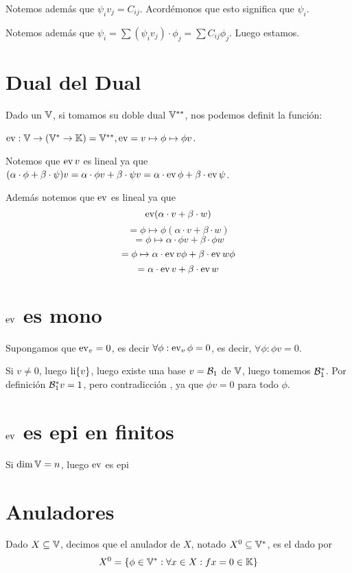 \documentclass{article}
\begin{document}
	Notemos además que $\psi_iv_j = C_{ij}$. Acordémonos que esto significa que
	$\psi_i$.

	Notemos además que $\psi_i = \sum (\psi_i v_j) \cdot \phi_j = \sum C_{ij}
	\phi_j$. Luego estamos.

	\section*{Dual del Dual}
	Dado un $\mathbb{V}$, si tomamos su doble dual $\mathbb{V}^{**}$, nos podemos definit la
	función:

	$\operatorname{ev} : \mathbb{V} \to (\mathbb{V}^* \to \mathbb{K}) = \mathbb{V}^{**}, \operatorname{ev} = v \mapsto \phi \mapsto
	\phi v$.

	Notemos que $\operatorname{ev} v$ es lineal ya que $(\alpha \cdot \phi + \beta \cdot \psi)v = 
	\alpha \cdot \phi v + \beta \cdot \psi v = \alpha \cdot \operatorname{ev} \phi + \beta
	\cdot \operatorname{ev} \psi
	$.

	Además notemos que $\operatorname{ev}$ es lineal ya que \[
		\operatorname{ev} (\alpha \cdot v + \beta \cdot w)
	\]\[
		= \phi \mapsto \phi (\alpha \cdot v + \beta \cdot w)
	\]\[
		= \phi \mapsto \alpha \cdot \phi v + \beta \cdot \phi w
	\]\[
		= \phi \mapsto \alpha \cdot \operatorname{ev} v \phi + \beta \cdot \operatorname{ev} w \phi
	\]\[
		= \alpha \cdot \operatorname{ev} v + \beta \cdot \operatorname{ev} w \]

	\section*{$\operatorname{ev}$ es mono}
	Supongamos que $\operatorname{ev}_v = 0$, es decir $\forall \phi: \operatorname{ev}_v \phi = 0$, es
	decir, $\forall \phi: \phi v = 0$.

	Si $v \neq 0$, luego $\operatorname{li} \{v\}$, luego existe una base $v = \mathcal{B}_1$ de $\mathbb{V}$,
	luego tomemos $\mathcal{B}^*_1$. Por definición $\mathcal{B}^*_1v = 1$, pero contradicción ,
	ya que $\phi v = 0$ para todo $\phi$.

	\section*{$\operatorname{ev}$ es epi en finitos}
	Si $\dim \mathbb{V} = n$, luego $\operatorname{ev}$ es epi

	\section*{Anuladores}
	Dado $X \subseteq \mathbb{V}$, decimos que el anulador de $X$, notado $X^0 \subseteq \mathbb{V}^*$, es
	el dado por
	\[X^0 = \{\phi \in \mathbb{V}^* : \forall x \in X : fx = 0 \in \mathbb{K} \}\]
\end{document}
